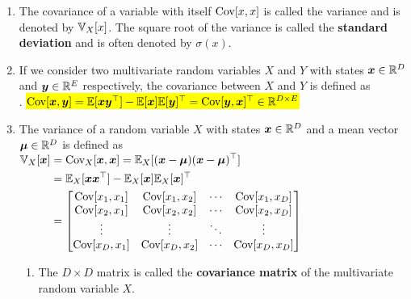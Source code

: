 \begin{enumerate}[series=calcrulesrv]
    \item The covariance of a variable with itself $\text{Cov}[x, x]$ is called the variance and is denoted by $\mathbb{V}_X [x]$. 
    The square root of the variance is called the \textbf{standard deviation} and is often denoted by $\sigma(x)$. 
    \hfill \cite{mfml/book/mml/Deisenroth-Faisal-Ong}

    \item If we consider two multivariate random variables $X$ and $Y$ with states $\bm{x} \in \mathbb{R}^D$ and $\bm{y} \in \mathbb{R}^E$ respectively, the covariance between $X$ and $Y$ is defined as
    \hfill \cite{mfml/book/mml/Deisenroth-Faisal-Ong}
    \\[0.2cm]
    .\hfill
    \colorbox{yellow}{$
        \text{Cov}[\bm{x}, \bm{y}] 
        = \mathbb{E}[\bm{xy}^\top ] - \mathbb{E}[\bm{x}]\mathbb{E}[\bm{y}]^\top  
        = \text{Cov}[\bm{y}, \bm{x}]^\top  
        \in \mathbb{R}^{D\times E}
    $}
    \hfill \cite{mfml/book/mml/Deisenroth-Faisal-Ong}

    \item The variance of a random variable $X$ with states $\bm{x} \in \mathbb{R}^D$ and a mean vector $\bm{\mu} \in \mathbb{R}^D$ is defined as
    \hfill \cite{mfml/book/mml/Deisenroth-Faisal-Ong}
    \\[0.2cm]
    $
        \begin{aligned}
            \mathbb{V}_X [\bm{x}] 
            &= \text{Cov}_X [\bm{x}, \bm{x}] 
            = \mathbb{E}_X [(\bm{x} - \bm{\mu})(\bm{x} - \bm{\mu})^\top ] \\
            &= \mathbb{E}_X [\bm{xx}^\top ] - \mathbb{E}_X [\bm{x}]\mathbb{E}_X [\bm{x}]^\top  \\
            &= \begin{bmatrix}
                \text{Cov}[x_1, x_1] & \text{Cov}[x_1, x_2] & \cdots & \text{Cov}[x_1, x_D ] \\
                \text{Cov}[x_2, x_1] & \text{Cov}[x_2, x_2] & \cdots & \text{Cov}[x_2, x_D ] \\
                \vdots & \vdots & \ddots & \vdots \\ 
                \text{Cov}[x_D, x_1] & \text{Cov}[x_D, x_2] & \cdots & \text{Cov}[x_D, x_D ] \\
            \end{bmatrix}
        \end{aligned}
    $
    \hfill \cite{mfml/book/mml/Deisenroth-Faisal-Ong}
    \begin{enumerate}
        \item The $D \times D$ matrix is called the \textbf{covariance matrix} of the multivariate random variable $X$. 
        \hfill \cite{mfml/book/mml/Deisenroth-Faisal-Ong}
        

\end{enumerate}
\end{enumerate}
